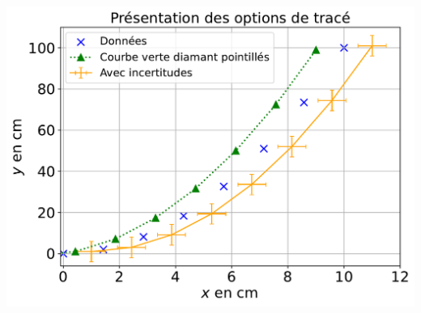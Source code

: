 \documentclass[a4paper, 12pt, garamond]{book}
\begin{document}
\begin{minipage}[t]{.48\linewidth}
	~
	\begin{center}
		\includegraphics[width=\linewidth]{figures/python_plt-2}
		\label{fig:cplx}
	\end{center}
\end{minipage}
\end{document}

